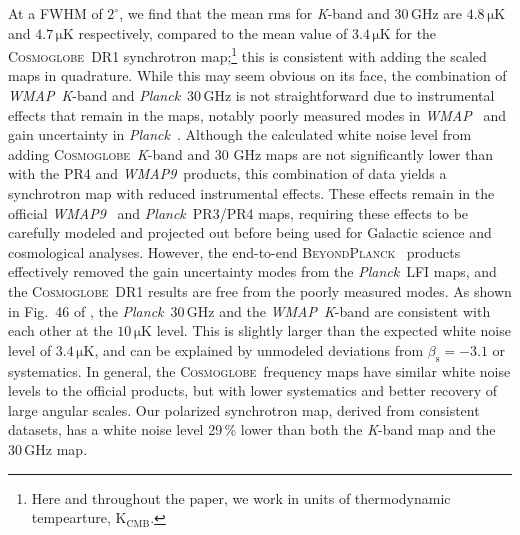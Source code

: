 \documentclass[twocolumn]{../../common/aa}
\def\WMAP{\emph{WMAP}}
\def\WMAPnine{\emph{WMAP9}}
\def\Planck{\emph{Planck}}
\newcommand{\bp}{\textsc{BeyondPlanck}}
\newcommand{\cosmoglobe}{\textsc{Cosmoglobe}}
\newcommand{\K}[0]{\textit K}
\begin{document}
At a FWHM of $2^\circ$, we find that the mean rms for \K-band and 30\,GHz are $4.8\,\mathrm{\mu K}$ and $4.7\,\mathrm{\mu K}$ respectively, compared to the mean value of $3.4\,\mathrm{\mu K}$ for the \cosmoglobe\ DR1 synchrotron map;\footnote{
	Here and throughout the paper, we work in units of thermodynamic tempearture, $\mathrm{K_{CMB}}.$
}
this is consistent with adding the scaled maps in quadrature. 
While this may seem obvious on its face,  the combination of \WMAP\ \K-band and \Planck\ 30\,GHz is not straightforward due to instrumental effects that remain in the maps, notably poorly measured modes in \WMAP\ \citep{bennett2012,weiland:2018} and gain uncertainty in \Planck\ \citep{planck2016-l02}. Although the calculated white noise level from adding \cosmoglobe\ \K-band and 30 GHz maps are not significantly lower than with the PR4 and \WMAPnine\ products, this combination of data yields a synchrotron map with reduced instrumental effects. These effects remain in the official \WMAPnine\ \citep{bennett2012} and \Planck\ PR3/PR4 \citep{planck2016-l02,planck2020-LVII} maps, requiring these effects to be carefully modeled and projected out before being used for  Galactic science and cosmological analyses. However, the end-to-end \bp\ \citep{bp01} products effectively removed the gain uncertainty modes from the \Planck\ LFI maps, and the \cosmoglobe\ DR1 results \citep{watts2023_dr1} are free from the poorly measured modes. As shown in Fig.~46 of \citet{watts2023_dr1}, the \Planck\ 30\,GHz and the \WMAP\ \K-band are consistent with each other at the $10\,\mathrm{\mu K}$ level. This is slightly larger than the expected white noise level of $3.4\,\mathrm{\mu K}$, and can be explained by unmodeled deviations from $\beta_\mathrm s=-3.1$ or systematics. In general, the \cosmoglobe\ frequency maps have similar white noise levels to the official products, but with lower systematics and better recovery of large angular scales.
Our polarized synchrotron map, derived from consistent datasets, has a white noise level 29\,\% lower than both the \K-band map and the 30\,GHz map.



\end{document}
